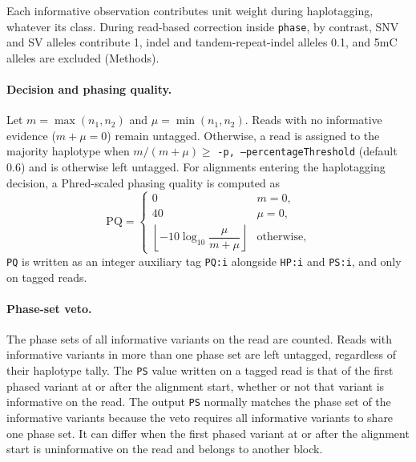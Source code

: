 \documentclass[11pt,a4paper]{article}
\newcommand{\code}[1]{\texttt{\small #1}}
\begin{document}
Each informative observation contributes unit weight during haplotagging, whatever its class. During read-based correction inside \code{phase}, by contrast, SNV and SV alleles contribute 1, indel and tandem-repeat-indel alleles 0.1, and 5mC alleles are excluded (Methods).

\paragraph{Decision and phasing quality.} Let $m = \max(n_1,n_2)$ and $\mu = \min(n_1,n_2)$. Reads with no informative evidence ($m+\mu=0$) remain untagged. Otherwise, a read is assigned to the majority haplotype when $m/(m+\mu) \ge$ \code{-p, --percentageThreshold} (default 0.6) and is otherwise left untagged. For alignments entering the haplotagging decision, a Phred-scaled phasing quality is computed as
\begin{equation}
\mathrm{PQ} = \begin{cases}
0 & m = 0,\\
40 & \mu = 0,\\
\left\lfloor -10\log_{10}\dfrac{\mu}{m+\mu} \right\rfloor & \text{otherwise,}
\end{cases}
\end{equation}
\code{PQ} is written as an integer auxiliary tag \code{PQ:i} alongside \code{HP:i} and \code{PS:i}, and only on tagged reads.

\paragraph{Phase-set veto.} The phase sets of all informative variants on the read are counted. Reads with informative variants in more than one phase set are left untagged, regardless of their haplotype tally. The \code{PS} value written on a tagged read is that of the first phased variant at or after the alignment start, whether or not that variant is informative on the read. The output \code{PS} normally matches the phase set of the informative variants because the veto requires all informative variants to share one phase set. It can differ when the first phased variant at or after the alignment start is uninformative on the read and belongs to another block.

\end{document}
